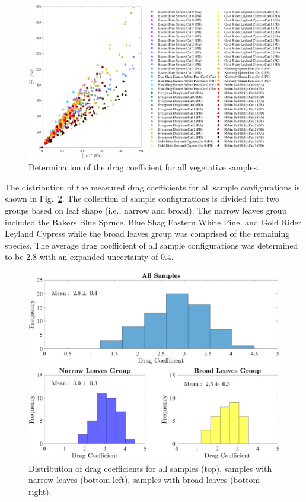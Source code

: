 \documentclass[12pt]{article}
\begin{document}
\begin{figure}
	\centering
	\includegraphics[width=\textwidth,keepaspectratio]{Picture9.pdf}
	\caption[Determination of the drag coefficient for all vegetative samples]{Determination of the drag coefficient for all vegetative samples.}
	\label{fig:DPoveraf(Overall)}
\end{figure}

The distribution of the measured drag coefficients for all sample configurations is shown in Fig.~\ref{fig:Histogram}. The collection of sample configurations is divided into two groups based on leaf shape (i.e., narrow and broad). The narrow leaves group included the Bakers Blue Spruce, Blue Shag Eastern White Pine, and Gold Rider Leyland Cypress while the broad leaves group was comprised of the remaining species. The average drag coefficient of all sample configurations was determined to be 2.8 with an expanded uncertainty of 0.4.

\begin{figure}[!]
\includegraphics[width=\textwidth,keepaspectratio]{Picture11.pdf}
	\caption[Distribution of vegetation sample drag coefficients]{Distribution of drag coefficients for all samples (top), samples with narrow leaves (bottom left), samples with broad leaves (bottom right).}
	\label{fig:Histogram}
\end{figure}
\end{document}
